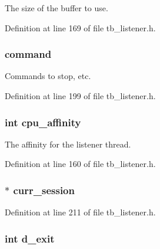The size of the buffer to use. 



Definition at line 169 of file tb\-\_\-listener.\-h.

\hypertarget{structtb__listener__t_a70d431da3740b5dedad495c2843ba89e}{
\subsubsection[{command}]{ command}}\label{structtb__listener__t_a70d431da3740b5dedad495c2843ba89e}


Commands to stop, etc. 



Definition at line 199 of file tb\-\_\-listener.\-h.

\hypertarget{structtb__listener__t_ab7a892d2900125821f3d6b11d003191b}{
\subsubsection[{cpu\-\_\-affinity}]{\setlength{\rightskip}{0pt plus 5cm}int cpu\-\_\-affinity}}\label{structtb__listener__t_ab7a892d2900125821f3d6b11d003191b}


The affinity for the listener thread. 



Definition at line 160 of file tb\-\_\-listener.\-h.

\hypertarget{structtb__listener__t_a77b5086c18c650adfe86a3489057d9f9}{
\subsubsection[{curr\-\_\-session}]{$\ast$ curr\-\_\-session}}\label{structtb__listener__t_a77b5086c18c650adfe86a3489057d9f9}


Definition at line 211 of file tb\-\_\-listener.\-h.

\hypertarget{structtb__listener__t_a73b88865af668ff87dacd74c1f838da6}{
\subsubsection[{d\-\_\-exit}]{\setlength{\rightskip}{0pt plus 5cm}int d\-\_\-exit}}\label{structtb__listener__t_a73b88865af668ff87dacd74c1f838da6}


